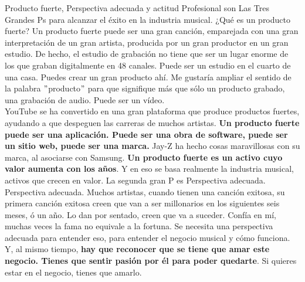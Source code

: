 \documentclass[10pt]{book}
\begin{document}
Producto fuerte, Perspectiva adecuada y actitud Profesional son Las Tres Grandes Ps para alcanzar el éxito en la industria musical. ¿Qué es un producto fuerte? Un producto fuerte puede ser una gran canción, emparejada con una gran interpretación de un gran artista, producida por un gran productor en un gran estudio. De hecho, el estudio de grabación no tiene que ser un lugar enorme de los que graban digitalmente en 48 canales. Puede ser un estudio en el cuarto de una casa. Puedes crear un gran producto ahí. Me gustaría ampliar el sentido de la palabra $"$producto$"$ para que signifique más que sólo un producto grabado,  una grabación de audio. Puede ser un vídeo.\\
YouTube se ha convertido en una gran plataforma que produce productos fuertes, ayudando a que despeguen  las carreras de muchos artistas. \textbf{Un producto fuerte puede ser una aplicación. Puede ser una obra de software, puede ser un sitio web,  puede ser una marca.} Jay-Z ha hecho cosas maravillosas con su marca, al asociarse con Samsung. \textbf{Un producto fuerte es un activo cuyo valor  aumenta con los años}. Y en eso se basa realmente la industria musical,  activos que crecen en valor. La segunda gran P es Perspectiva adecuada. Perspectiva adecuada. Muchos artistas, cuando tienen una canción exitosa, su primera canción exitosa creen que van a ser millonarios en los siguientes seis meses,  ó un año. Lo dan por sentado, creen que va a suceder. Confía en mí, muchas veces la fama  no equivale a la fortuna. Se necesita una perspectiva adecuada  para entender eso, para entender el negocio musical y cómo funciona. Y, al mismo tiempo, \textbf{hay que reconocer que se tiene que amar este negocio. Tienes que sentir pasión por él para poder quedarte}. Si quieres estar en el negocio, tienes que amarlo. \\
\end{document}
